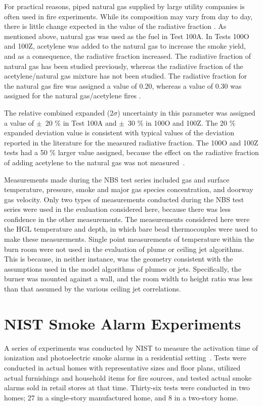 For practical reasons, piped natural gas supplied by large utility companies is often used in fire experiments.  While its composition may vary from day to day, there is little change expected in the value of the radiative fraction \cite{NRCNUREG1824}. As mentioned above, natural gas was used as the fuel in Test 100A.  In Tests 100O and 100Z, acetylene was added to the natural gas to increase the smoke yield, and as a consequence, the radiative fraction increased.  The radiative fraction of natural gas has been studied previously, whereas the radiative fraction of the acetylene/natural gas mixture has not been studied. The radiative fraction for the natural gas fire was assigned a value of 0.20, whereas a value of 0.30 was assigned for the natural gas/acetylene fires \cite{NRCNUREG1824, Hamins:1991}.

The relative combined expanded (2$\sigma$) uncertainty in this parameter was assigned a value of $\pm$~20 \% in Test 100A and $\pm$~30 \% in 100O and 100Z.  The 20 \% expanded deviation value is consistent with typical values of the deviation reported in the literature for the measured radiative fraction.  The 100O and 100Z tests had a 50 \% larger value assigned, because the effect on the radiative fraction of adding acetylene to the natural gas was not measured~\cite{NRCNUREG1824}.

Measurements made during the NBS test series included gas and surface temperature, pressure, smoke and major gas species concentration, and doorway gas velocity.  Only two types of measurements conducted during the NBS test series were used in the evaluation considered here, because there was less confidence in the other measurements.  The measurements considered here were the HGL temperature and depth, in which bare bead thermocouples were used to make these measurements.  Single point measurements of temperature within the burn room were not used in the evaluation of plume or ceiling jet algorithms.  This is because, in neither instance, was the geometry consistent with the assumptions used in the model algorithms of plumes or jets. Specifically, the burner was mounted against a wall, and the room width to height ratio was less than that assumed by the various ceiling jet correlations.

\section{NIST Smoke Alarm Experiments}

A series of experiments was conducted by NIST to measure the activation time of ionization and photoelectric
smoke alarms in a residential setting~\cite{Bukowski:1}. Tests were conducted in actual homes with
representative sizes and floor plans, utilized actual furnishings and household items for fire sources,
and tested actual smoke alarms sold in retail stores at that time. Thirty-six tests were conducted in two
homes; 27 in a single-story manufactured home, and 8 in a two-story home.

